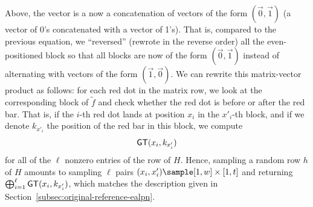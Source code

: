 \begin{center}
\end{center}
Above, the vector is a now a concatenation of vectors of the form $(\vec 0, \vec 1)$ (a vector of 0's concatenated with a vector of 1's). That is, compared to the previous equation, we ``reversed'' (rewrote in the reverse order) all the even-positioned block so that all blocks are now of the form $(\vec 0, \vec 1)$ instead of alternating with vectors of the form $(\vec 1, \vec 0)$. We can rewrite this matrix-vector product as follows: for each red dot in the matrix row, we look at the corresponding block of $\tilde f$ and check whether the red dot is before or after the red bar. That is, if the $i$-th red dot lands at position $x_i$ in the $x'_i$-th block, and if we denote $k_{x'_i}$ the position of the red bar in this block, we compute
\[\mathsf{GT}(x_i, k_{x'_i})\]
for all of the $\ell$ nonzero entries of the row of $H$. Hence, sampling a random row $h$ of $H$ amounts to sampling $\ell$ pairs $(x_i, x'_i) \sample [1,w]\times [1,t]$ and returning
$\bigoplus_{i=1}^\ell \mathsf{GT}(x_i, k_{x'_i})$,
which matches the description given in Section~\ref{subsec:original-reference-ealpn}.

